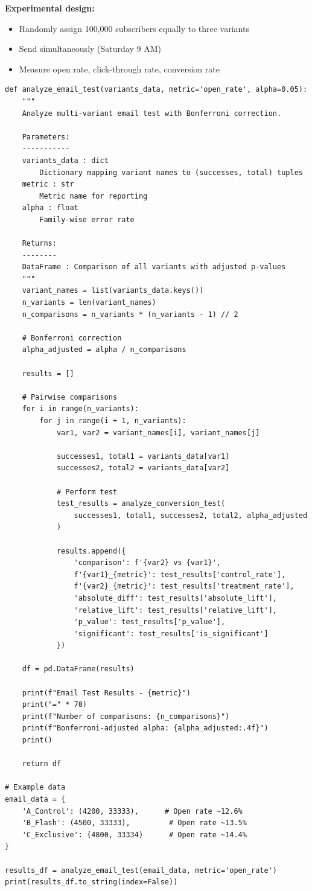 \textbf{Experimental design:}
\begin{itemize}
    \item Randomly assign 100,000 subscribers equally to three variants
    \item Send simultaneously (Saturday 9 AM)
    \item Measure open rate, click-through rate, conversion rate
\end{itemize}

\lstset{language=Python, caption=Multi-Variant Email Test Analysis}
\begin{lstlisting}
def analyze_email_test(variants_data, metric='open_rate', alpha=0.05):
    """
    Analyze multi-variant email test with Bonferroni correction.

    Parameters:
    -----------
    variants_data : dict
        Dictionary mapping variant names to (successes, total) tuples
    metric : str
        Metric name for reporting
    alpha : float
        Family-wise error rate

    Returns:
    --------
    DataFrame : Comparison of all variants with adjusted p-values
    """
    variant_names = list(variants_data.keys())
    n_variants = len(variant_names)
    n_comparisons = n_variants * (n_variants - 1) // 2

    # Bonferroni correction
    alpha_adjusted = alpha / n_comparisons

    results = []

    # Pairwise comparisons
    for i in range(n_variants):
        for j in range(i + 1, n_variants):
            var1, var2 = variant_names[i], variant_names[j]

            successes1, total1 = variants_data[var1]
            successes2, total2 = variants_data[var2]

            # Perform test
            test_results = analyze_conversion_test(
                successes1, total1, successes2, total2, alpha_adjusted
            )

            results.append({
                'comparison': f'{var2} vs {var1}',
                f'{var1}_{metric}': test_results['control_rate'],
                f'{var2}_{metric}': test_results['treatment_rate'],
                'absolute_diff': test_results['absolute_lift'],
                'relative_lift': test_results['relative_lift'],
                'p_value': test_results['p_value'],
                'significant': test_results['is_significant']
            })

    df = pd.DataFrame(results)

    print(f"Email Test Results - {metric}")
    print("=" * 70)
    print(f"Number of comparisons: {n_comparisons}")
    print(f"Bonferroni-adjusted alpha: {alpha_adjusted:.4f}")
    print()

    return df

# Example data
email_data = {
    'A_Control': (4200, 33333),      # Open rate ~12.6%
    'B_Flash': (4500, 33333),         # Open rate ~13.5%
    'C_Exclusive': (4800, 33334)      # Open rate ~14.4%
}

results_df = analyze_email_test(email_data, metric='open_rate')
print(results_df.to_string(index=False))
\end{lstlisting}

